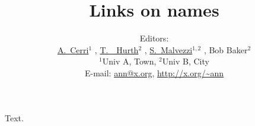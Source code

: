 \documentclass{article}
\begin{document}
\title{Links on names}
\author{Editors: \\\href{http://inspirehep.net/record/1}{A.~Cerri}$^{1}$
, \href{http://inspirehep.net/record/2}{T.~~Hurth}$^{2}$
, \href{http://inspirehep.net/record/3}{S.~Malvezzi}$^{1,2}$
, Bob Baker$^{2}$
\\ \vspace*{4mm} $^{1}$Univ A, Town, $^{2}$Univ B, City
\\ E-mail: \href{mailto:ann@x.org}{ann@x.org}, \url{http://x.org/~ann}}
\maketitle
Text.
\end{document}
